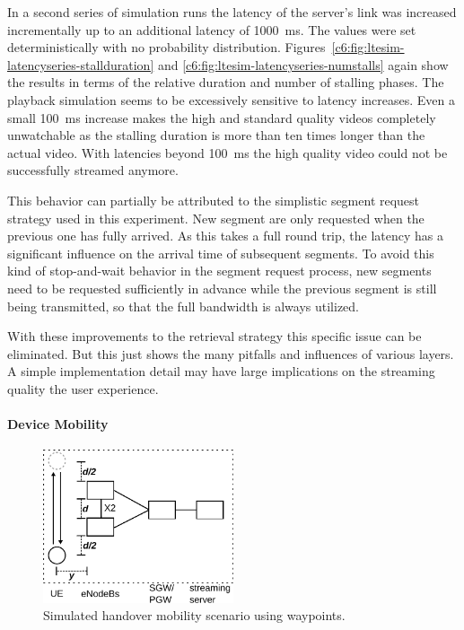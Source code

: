 In a second series of simulation runs the latency of the server's link was increased incrementally up to an additional latency of \SI{1000}{\milli\second}. The values were set deterministically with no probability distribution. Figures~\ref{c6:fig:ltesim-latencyseries-stallduration} and \ref{c6:fig:ltesim-latencyseries-numstalls} again show the results in terms of the relative duration and number of stalling phases. The playback simulation seems to be excessively sensitive to latency increases. Even a small \SI{100}{\milli\second} increase makes the high and standard quality videos completely unwatchable as the stalling duration is more than ten times longer than the actual video. With latencies beyond \SI{100}{\milli\second} the high quality video could not be successfully streamed anymore. 


This behavior can partially be attributed to the simplistic segment request strategy used in this experiment. New segment are only requested when the previous one has fully arrived. As this takes a full round trip, the latency has a significant influence on the arrival time of subsequent segments. To avoid this kind of stop-and-wait behavior in the segment request process, new segments need to be requested sufficiently in advance while the previous segment is still being transmitted, so that the full bandwidth is always utilized.

With these improvements to the retrieval strategy this specific issue can be eliminated. But this just shows the many pitfalls and influences of various layers. A simple implementation detail may have large implications on the streaming quality the user experience.


\paragraph{Device Mobility}
\label{c6:sec:mobilitystreamingsim}

\begin{figure}[htb]
	\centering
	\includegraphics[width=0.5\textwidth]{images/streaming-simulation-mobility.pdf}
	\caption{Simulated handover mobility scenario using waypoints.}
\label{c6:fig:streaming-simulation-mobility}
\end{figure}


